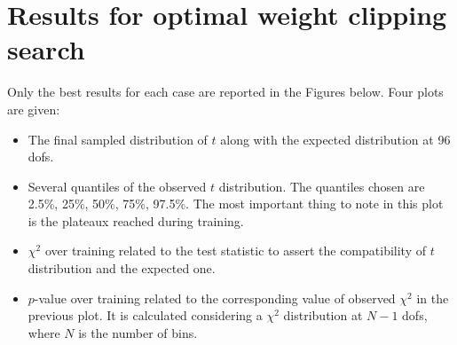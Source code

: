 \section{Results for optimal weight clipping search}
Only the best results for each case are reported in the Figures below. Four plots are given:
\begin{itemize}
	\item The final sampled distribution of $t$ along with the expected distribution at 96 dofs.
	\item Several quantiles of the observed $t$ distribution. The quantiles chosen are 2.5\%, 25\%, 50\%, 75\%, 97.5\%. The most important thing to note in this plot is the plateaux reached during training.
	\item $\chi^2$ over training related to the test statistic to assert the compatibility of $t$ distribution and the expected one.
	\item $p$-value over training related to the corresponding value of observed $\chi^2$ in the previous plot. It is calculated considering a $\chi^2$ distribution at $N-1$ dofs, where $N$ is the number of bins.
\end{itemize}




